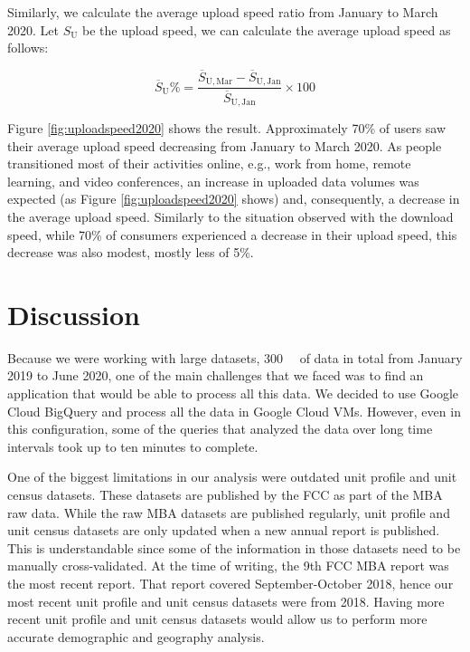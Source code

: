 \documentclass[conference,10pt]{IEEEtran}
\begin{document}
Similarly, we calculate the average upload speed ratio from January to March 2020. Let $S_{\text{U}}$ be the upload speed, we can calculate the average upload speed as follows:

\begin{equation}
\overline{S}_{\text{U}}\% = \frac{\overline{S}_{\text{U},\, \text{Mar}}-\overline{S}_{\text{U},\, \text{Jan}}}{\overline{S}_{\text{U},\, \text{Jan}}}\times 100
\end{equation}


Figure \ref{fig:uploadspeed2020} shows the result. Approximately 70\% of users saw their average upload speed decreasing from January to March 2020. As people transitioned most of their activities online, e.g., work from home, remote learning, and video conferences, an increase in uploaded data volumes was expected (as Figure \ref{fig:uploadspeed2020} shows) and, consequently, a decrease in the average upload speed. Similarly to the situation observed with the download speed, while 70\% of consumers experienced a decrease in their upload speed, this decrease was also modest, mostly less of 5\%.




\section{Discussion}
\label{sec:discussion}

Because we were working with large datasets, \SI{300}{\giga\byte} of data in total from January 2019 to June 2020, one of the main challenges that we faced was to find an application that would be able to process all this data. We decided to use Google Cloud BigQuery and process all the data in Google Cloud VMs. However, even in this configuration, some of the queries that analyzed the data over long time intervals took up to ten minutes to complete.

One of the biggest limitations in our analysis were outdated unit profile and unit census datasets. These datasets are published by the FCC as part of the MBA raw data. While the raw MBA datasets are published regularly, unit profile and unit census datasets are only updated when a new annual report is published. This is understandable since some of the information in those datasets need to be manually cross-validated. At the time of writing, the 9th FCC MBA report was the most recent report. That report covered September-October 2018, hence our most recent unit profile and unit census datasets were from 2018. Having more recent unit profile and unit census datasets would allow us to perform more accurate demographic and geography analysis.
\end{document}
